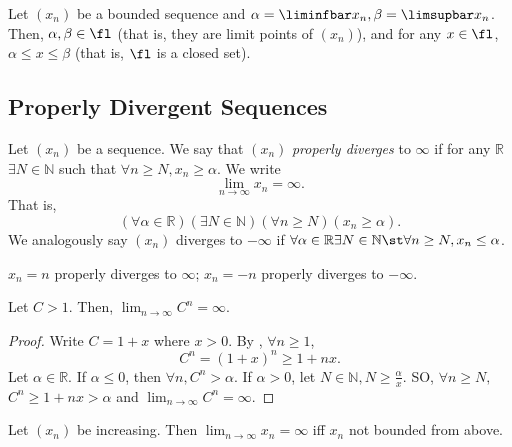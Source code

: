 \documentclass[12pt]{article}
\begin{document}
\begin{corollary}
  Let $(x_n)$ be a bounded sequence and $\alpha = \liminfbar x_n, \beta = \limsupbar x_n$. Then, $\alpha, \beta \in \fl$ (that is, they are limit points of $(x_n)$), and for any $x \in \fl$, $\alpha \leq x \leq \beta$ (that is, $\fl$ is a closed set).
\end{corollary}

\subsection{Properly Divergent Sequences}
\begin{definition}
  Let $(x_n)$ be a sequence. We say that $(x_n)$ \emph{properly diverges} to $\infty$ if for any $\mathbb{R}$ $\exists N \in \mathbb{N}$ such that $\forall n \geq N, x_n \geq \alpha$. We write \[\lim_{n\to\infty} x_n = \infty.\] That is, \[(\forall \alpha \in \mathbb{R})(\exists N \in \mathbb{N})(\forall n \geq N)(x_n \geq \alpha).\] We analogously say $(x_n)$ diverges to $- \infty$ if $\forall \alpha \in \mathbb{R} \exists N \in \mathbb{N} \st \forall n \geq N, x_n \leq \alpha$.
\end{definition}

\begin{example}
$x_n = n$ properly diverges to $\infty$; $x_n = -n$ properly diverges to $-\infty$.
\end{example}
\begin{example}
  Let $C > 1$. Then, $\lim_{n\to\infty} C^n = \infty$.
  \begin{proof}
    Write $C = 1 + x$ where $x > 0$. By , $\forall n \geq 1$, \[
    C^n = (1+x)^n \geq 1+nx.  
    \]
    Let $\alpha \in \mathbb{R}$. If $\alpha \leq 0$, then $\forall n, C^n > \alpha$. If $\alpha > 0$, let $N \in \mathbb{N}, N \geq \frac{\alpha}{x}.$ SO, $\forall n \geq N,$ $C^n \geq 1 + nx > \alpha$ and $\lim_{n\to\infty} C^n = \infty$. 
  \end{proof}
\end{example}


\begin{proposition}\label{prop:unboundedpropdiv}
  Let $(x_n)$ be increasing. Then $\lim_{n \to \infty} x_n = \infty$ iff $x_n$ not bounded from above.
\end{proposition}
\end{document}
